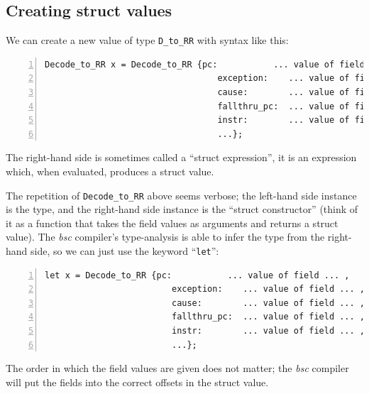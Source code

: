 
\subsection{Creating struct values}


We can create a new value of type \verb|D_to_RR| with syntax like
this:

{\small
\begin{Verbatim}[frame=single, numbers=left]
   Decode_to_RR x = Decode_to_RR {pc:           ... value of field ... ,
                                  exception:    ... value of field ... ,
                                  cause:        ... value of field ... ,
                                  fallthru_pc:  ... value of field ... ,
                                  instr:        ... value of field ... ,
                                  ...};
\end{Verbatim}
}

The right-hand side is sometimes called a ``struct expression'', {\ie}
it is an expression which, when evaluated, produces a struct value.

The repetition of \verb|Decode_to_RR| above seems verbose; the
left-hand side instance is the type, and the right-hand side instance
is the ``struct constructor'' (think of it as a function that takes
the field values as arguments and returns a struct value). The
\emph{bsc} compiler's type-analysis is able to infer the type from the
right-hand side, so we can just use the keyword ``\verb|let|'':


{\small
\begin{Verbatim}[frame=single, numbers=left]
   let x = Decode_to_RR {pc:           ... value of field ... ,
                         exception:    ... value of field ... ,
                         cause:        ... value of field ... ,
                         fallthru_pc:  ... value of field ... ,
                         instr:        ... value of field ... ,
                         ...};
\end{Verbatim}
}

The order in which the field values are given does not matter; the
\emph{bsc} compiler will put the fields into the correct offsets in
the struct value.

